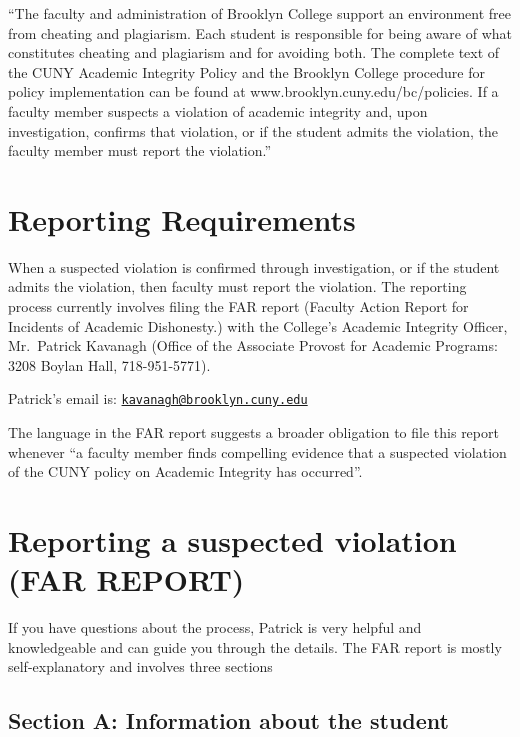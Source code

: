 \documentclass[]{book}
\theoremstyle{definition}
\theoremstyle{definition}
\theoremstyle{definition}
\theoremstyle{remark}
\begin{document}
``The faculty and administration of Brooklyn College support an
environment free from cheating and plagiarism. Each student is
responsible for being aware of what constitutes cheating and plagiarism
and for avoiding both. The complete text of the CUNY Academic Integrity
Policy and the Brooklyn College procedure for policy implementation can
be found at www.brooklyn.cuny.edu/bc/policies. If a faculty member
suspects a violation of academic integrity and, upon investigation,
confirms that violation, or if the student admits the violation, the
faculty member must report the violation.''

\section{Reporting Requirements}\label{reporting-requirements}

When a suspected violation is confirmed through investigation, or if the
student admits the violation, then faculty must report the violation.
The reporting process currently involves filing the FAR report (Faculty
Action Report for Incidents of Academic Dishonesty.) with the College's
Academic Integrity Officer, Mr.~Patrick Kavanagh (Office of the
Associate Provost for Academic Programs: 3208 Boylan Hall,
718-951-5771).

Patrick's email is:
\href{mailto:kavanagh@brooklyn.cuny.edu}{\nolinkurl{kavanagh@brooklyn.cuny.edu}}

The language in the FAR report suggests a broader obligation to file
this report whenever ``a faculty member finds compelling evidence that a
suspected violation of the CUNY policy on Academic Integrity has
occurred''.

\section{Reporting a suspected violation (FAR
REPORT)}\label{reporting-a-suspected-violation-far-report}

If you have questions about the process, Patrick is very helpful and
knowledgeable and can guide you through the details. The FAR report is
mostly self-explanatory and involves three sections

\subsection{Section A: Information about the
student}\label{section-a-information-about-the-student}
\end{document}
